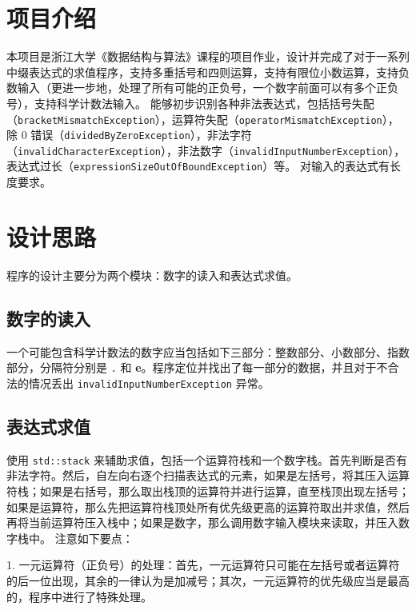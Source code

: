 \documentclass[UTF8]{ctexart}
\begin{document}
\pagestyle{fancy}
\fancyhead{}

\section{项目介绍}

    本项目是浙江大学《数据结构与算法》课程的项目作业，设计并完成了对于一系列中缀表达式的求值程序，支持多重括号和四则运算，支持有限位小数运算，支持负数输入（更进一步地，处理了所有可能的正负号，一个数字前面可以有多个正负号），支持科学计数法输入。
    能够初步识别各种非法表达式，包括括号失配（\texttt{bracketMismatchException}），运算符失配（\texttt{operatorMismatchException}），除 $0$ 错误（\texttt{dividedByZeroException}），非法字符（\texttt{invalidCharacterException}），非法数字（\texttt{invalidInputNumberException}），表达式过长（\texttt{expressionSizeOutOfBoundException}）等。
    对输入的表达式有长度要求。

\section{设计思路}

程序的设计主要分为两个模块：数字的读入和表达式求值。

\subsection{数字的读入}
    一个可能包含科学计数法的数字应当包括如下三部分：整数部分、小数部分、指数部分，分隔符分别是 \texttt{.} 和 \textbf{e}。程序定位并找出了每一部分的数据，并且对于不合法的情况丢出 \texttt{invalidInputNumberException} 异常。

\subsection{表达式求值}
    使用 \texttt{std::stack} 来辅助求值，包括一个运算符栈和一个数字栈。首先判断是否有非法字符。然后，自左向右逐个扫描表达式的元素，如果是左括号，将其压入运算符栈；如果是右括号，那么取出栈顶的运算符并进行运算，直至栈顶出现左括号；如果是运算符，那么先把运算符栈顶处所有优先级更高的运算符取出并求值，然后再将当前运算符压入栈中；如果是数字，那么调用数字输入模块来读取，并压入数字栈中。
    注意如下要点：

        1. 一元运算符（正负号）的处理：首先，一元运算符只可能在左括号或者运算符的后一位出现，其余的一律认为是加减号；其次，一元运算符的优先级应当是最高的，程序中进行了特殊处理。
\end{document}
